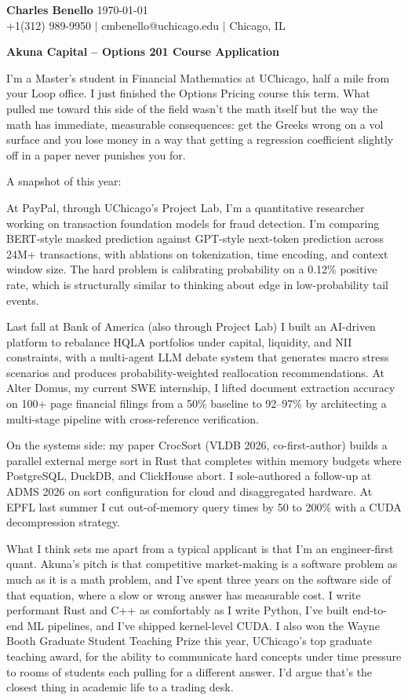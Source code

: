 \documentclass[letterpaper,11pt]{article}
\begin{document}
\noindent\textbf{\large Charles Benello} \hfill \today \\
\noindent +1(312) 989-9950 $|$ cmbenello@uchicago.edu $|$ Chicago, IL

\vspace{8pt}

\noindent\textbf{Akuna Capital -- Options 201 Course Application}

\vspace{4pt}

I'm a Master's student in Financial Mathematics at UChicago, half a mile from your Loop office. I just finished the Options Pricing course this term. What pulled me toward this side of the field wasn't the math itself but the way the math has immediate, measurable consequences: get the Greeks wrong on a vol surface and you lose money in a way that getting a regression coefficient slightly off in a paper never punishes you for.

A snapshot of this year:

At PayPal, through UChicago's Project Lab, I'm a quantitative researcher working on transaction foundation models for fraud detection. I'm comparing BERT-style masked prediction against GPT-style next-token prediction across 24M+ transactions, with ablations on tokenization, time encoding, and context window size. The hard problem is calibrating probability on a 0.12\% positive rate, which is structurally similar to thinking about edge in low-probability tail events.

Last fall at Bank of America (also through Project Lab) I built an AI-driven platform to rebalance HQLA portfolios under capital, liquidity, and NII constraints, with a multi-agent LLM debate system that generates macro stress scenarios and produces probability-weighted reallocation recommendations. At Alter Domus, my current SWE internship, I lifted document extraction accuracy on 100+ page financial filings from a 50\% baseline to 92--97\% by architecting a multi-stage pipeline with cross-reference verification.

On the systems side: my paper CrocSort (VLDB 2026, co-first-author) builds a parallel external merge sort in Rust that completes within memory budgets where PostgreSQL, DuckDB, and ClickHouse abort. I sole-authored a follow-up at ADMS 2026 on sort configuration for cloud and disaggregated hardware. At EPFL last summer I cut out-of-memory query times by 50 to 200\% with a CUDA decompression strategy.

What I think sets me apart from a typical applicant is that I'm an engineer-first quant. Akuna's pitch is that competitive market-making is a software problem as much as it is a math problem, and I've spent three years on the software side of that equation, where a slow or wrong answer has measurable cost. I write performant Rust and C++ as comfortably as I write Python, I've built end-to-end ML pipelines, and I've shipped kernel-level CUDA. I also won the Wayne Booth Graduate Student Teaching Prize this year, UChicago's top graduate teaching award, for the ability to communicate hard concepts under time pressure to rooms of students each pulling for a different answer. I'd argue that's the closest thing in academic life to a trading desk.
\end{document}
